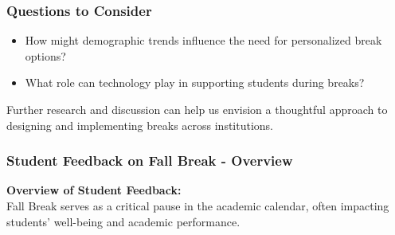 \documentclass[aspectratio=169]{beamer}
\begin{document}
\begin{frame}[fragile]
    \frametitle{Questions to Consider}
    \begin{itemize}
        \item How might demographic trends influence the need for personalized break options?
        \item What role can technology play in supporting students during breaks?
    \end{itemize}
    
    Further research and discussion can help us envision a thoughtful approach to designing and implementing breaks across institutions.
\end{frame}

\begin{frame}[fragile]
    \frametitle{Student Feedback on Fall Break - Overview}
    \textbf{Overview of Student Feedback:} \\
    Fall Break serves as a critical pause in the academic calendar, often impacting students' well-being and academic performance.
\end{frame}
\end{document}
